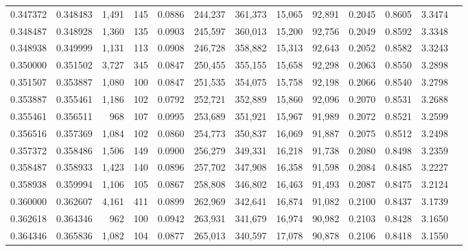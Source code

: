 \begin{tabular}{rrrrrrrrrrrrr}
0.347372 & 0.348483 & 1,491 & 145 &                                     0.0886 & 244,237 & 361,373 &  15,065 &  92,891 & 0.2045 & 0.8605 & 3.3474 \\
0.348487 & 0.348928 & 1,360 & 135 &                                     0.0903 & 245,597 & 360,013 &  15,200 &  92,756 & 0.2049 & 0.8592 & 3.3348 \\
0.348938 & 0.349999 & 1,131 & 113 &                                     0.0908 & 246,728 & 358,882 &  15,313 &  92,643 & 0.2052 & 0.8582 & 3.3243 \\
0.350000 & 0.351502 & 3,727 & 345 &                                     0.0847 & 250,455 & 355,155 &  15,658 &  92,298 & 0.2063 & 0.8550 & 3.2898 \\
0.351507 & 0.353887 & 1,080 & 100 &                                     0.0847 & 251,535 & 354,075 &  15,758 &  92,198 & 0.2066 & 0.8540 & 3.2798 \\
0.353887 & 0.355461 & 1,186 & 102 &                                     0.0792 & 252,721 & 352,889 &  15,860 &  92,096 & 0.2070 & 0.8531 & 3.2688 \\
0.355461 & 0.356511 &   968 & 107 &                                     0.0995 & 253,689 & 351,921 &  15,967 &  91,989 & 0.2072 & 0.8521 & 3.2599 \\
0.356516 & 0.357369 & 1,084 & 102 &                                     0.0860 & 254,773 & 350,837 &  16,069 &  91,887 & 0.2075 & 0.8512 & 3.2498 \\
0.357372 & 0.358486 & 1,506 & 149 &                                     0.0900 & 256,279 & 349,331 &  16,218 &  91,738 & 0.2080 & 0.8498 & 3.2359 \\
0.358487 & 0.358933 & 1,423 & 140 &                                     0.0896 & 257,702 & 347,908 &  16,358 &  91,598 & 0.2084 & 0.8485 & 3.2227 \\
0.358938 & 0.359994 & 1,106 & 105 &                                     0.0867 & 258,808 & 346,802 &  16,463 &  91,493 & 0.2087 & 0.8475 & 3.2124 \\
0.360000 & 0.362607 & 4,161 & 411 &                                     0.0899 & 262,969 & 342,641 &  16,874 &  91,082 & 0.2100 & 0.8437 & 3.1739 \\
0.362618 & 0.364346 &   962 & 100 &                                     0.0942 & 263,931 & 341,679 &  16,974 &  90,982 & 0.2103 & 0.8428 & 3.1650 \\
0.364346 & 0.365836 & 1,082 & 104 &                                     0.0877 & 265,013 & 340,597 &  17,078 &  90,878 & 0.2106 & 0.8418 & 3.1550 \\

\end{tabular}
